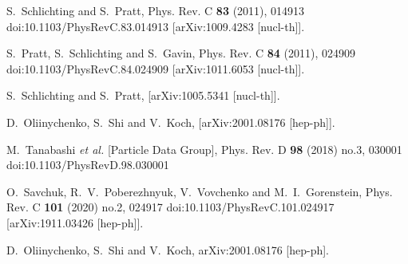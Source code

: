 
\begin{thebibliography}{99}

S.~Schlichting and S.~Pratt,
Phys. Rev. C \textbf{83} (2011), 014913
doi:10.1103/PhysRevC.83.014913
[arXiv:1009.4283 [nucl-th]].

S.~Pratt, S.~Schlichting and S.~Gavin,
Phys. Rev. C \textbf{84} (2011), 024909
doi:10.1103/PhysRevC.84.024909
[arXiv:1011.6053 [nucl-th]].

S.~Schlichting and S.~Pratt,
[arXiv:1005.5341 [nucl-th]].

D.~Oliinychenko, S.~Shi and V.~Koch,
[arXiv:2001.08176 [hep-ph]].

M.~Tanabashi \textit{et al.} [Particle Data Group],
Phys. Rev. D \textbf{98} (2018) no.3, 030001
doi:10.1103/PhysRevD.98.030001

O.~Savchuk, R.~V.~Poberezhnyuk, V.~Vovchenko and M.~I.~Gorenstein,
Phys. Rev. C \textbf{101} (2020) no.2, 024917
doi:10.1103/PhysRevC.101.024917
[arXiv:1911.03426 [hep-ph]].

  D.~Oliinychenko, S.~Shi and V.~Koch,
  arXiv:2001.08176 [hep-ph].
  

\end{thebibliography}
